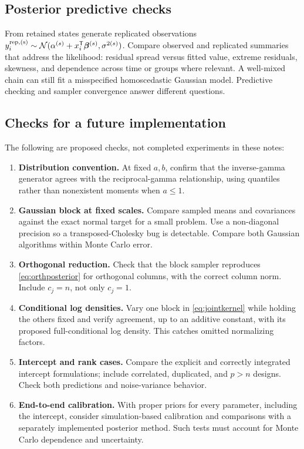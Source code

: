 \documentclass[11pt,letterpaper]{article}
\numberwithin{equation}{section}
\newcommand{\Normal}{\mathcal{N}}
\newcommand{\bbeta}{\bm{\beta}}
\newcommand{\trans}{^{\mathsf T}}
\begin{document}
\subsection{Posterior predictive checks}

From retained states generate replicated observations
\(y_i^{\rm rep,(s)}\sim
\Normal(\alpha^{(s)}+x_i\trans\bbeta^{(s)},\sigma^{2(s)})\).
Compare observed and replicated summaries that address the likelihood:
residual spread versus fitted value, extreme residuals, skewness, and
dependence across time or groups where relevant. A well-mixed chain can still
fit a misspecified homoscedastic Gaussian model. Predictive checking and
sampler convergence answer different questions.

\subsection{Checks for a future implementation}

The following are proposed checks, not completed experiments in these notes:
\begin{enumerate}
\item \textbf{Distribution convention.} At fixed \(a,b\), confirm that the
inverse-gamma generator agrees with the reciprocal-gamma relationship, using
quantiles rather than nonexistent moments when \(a\leq1\).
\item \textbf{Gaussian block at fixed scales.} Compare sampled means and
covariances against the exact normal target for a small problem. Use a
non-diagonal precision so a transposed-Cholesky bug is detectable. Compare
both Gaussian algorithms within Monte Carlo error.
\item \textbf{Orthogonal reduction.} Check that the block sampler reproduces
\eqref{eq:orthposterior} for orthogonal columns, with the correct column
norm. Include \(c_j=n\), not only \(c_j=1\).
\item \textbf{Conditional log densities.} Vary one block in
\eqref{eq:jointkernel} while holding the others fixed and verify agreement,
up to an additive constant, with its proposed full-conditional log density.
This catches omitted normalizing factors.
\item \textbf{Intercept and rank cases.} Compare the explicit and correctly
integrated intercept formulations; include correlated, duplicated, and
\(p>n\) designs. Check both predictions and noise-variance behavior.
\item \textbf{End-to-end calibration.} With proper priors for every parameter,
including the intercept, consider simulation-based calibration and comparisons
with a separately implemented posterior method. Such tests must account for
Monte Carlo dependence and uncertainty.
\end{enumerate}
\end{document}
